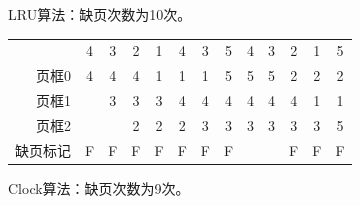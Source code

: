 \begin{solution}
    LRU算法：缺页次数为10次。
    \begin{table}[H]
        \centering
        \vspace{-0.5em}
        \begin{tabular}{rcccccccccccc}
        \multicolumn{1}{c}{}     & 4                      & 3                      & 2                      & 1                      & 4                      & 3                      & 5                      & 4                      & 3                      & 2                      & 1                      & 5                      \\ \cline{2-13} 
        \multicolumn{1}{r|}{页框0} & \multicolumn{1}{c|}{4} & \multicolumn{1}{c|}{4} & \multicolumn{1}{c|}{4} & \multicolumn{1}{c|}{1} & \multicolumn{1}{c|}{1} & \multicolumn{1}{c|}{1} & \multicolumn{1}{c|}{5} & \multicolumn{1}{c|}{5} & \multicolumn{1}{c|}{5} & \multicolumn{1}{c|}{2} & \multicolumn{1}{c|}{2} & \multicolumn{1}{c|}{2} \\ \cline{2-13} 
        \multicolumn{1}{r|}{页框1} & \multicolumn{1}{c|}{}  & \multicolumn{1}{c|}{3} & \multicolumn{1}{c|}{3} & \multicolumn{1}{c|}{3} & \multicolumn{1}{c|}{4} & \multicolumn{1}{c|}{4} & \multicolumn{1}{c|}{4} & \multicolumn{1}{c|}{4} & \multicolumn{1}{c|}{4} & \multicolumn{1}{c|}{4} & \multicolumn{1}{c|}{1} & \multicolumn{1}{c|}{1} \\ \cline{2-13} 
        \multicolumn{1}{r|}{页框2} & \multicolumn{1}{c|}{}  & \multicolumn{1}{c|}{}  & \multicolumn{1}{c|}{2} & \multicolumn{1}{c|}{2} & \multicolumn{1}{c|}{2} & \multicolumn{1}{c|}{3} & \multicolumn{1}{c|}{3} & \multicolumn{1}{c|}{3} & \multicolumn{1}{c|}{3} & \multicolumn{1}{c|}{3} & \multicolumn{1}{c|}{3} & \multicolumn{1}{c|}{5} \\ \cline{2-13} 
        缺页标记                     & F                      & F                      & F                      & F                      & F                      & F                      & F                      &                        &                        & F                      & F                      & F                     
        \end{tabular}
        \vspace{-1.5em}
        \end{table}
    Clock算法：缺页次数为9次。
    \begin{table}[H]
        \centering
        \vspace{-0.5em}
        \begin{tabular}{rcccccccccccc}

\end{tabular}
\end{table}
\end{solution}
